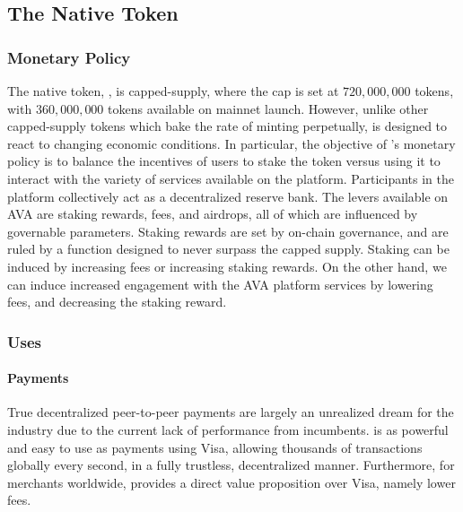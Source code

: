 \documentclass[runningheads]{llncs}
\begin{document}
\subsection{The \AVATokenName{} Native Token}

\subsubsection{Monetary Policy}
The native token, \AVATokenName{}, is capped-supply, where the cap is set at $720,000,000$ tokens, with $360,000,000$ tokens available on mainnet launch. However, unlike other capped-supply tokens which bake the rate of minting perpetually, \AVATokenName{} is designed to react to changing economic conditions. In particular, the objective of \AVATokenName{}'s monetary policy is to balance the incentives of users to stake the token versus using it to interact with the variety of services available on the platform. Participants in the platform collectively act as a decentralized reserve bank. The levers available on AVA are staking rewards, fees, and airdrops, all of which are influenced by governable parameters. Staking rewards are set by on-chain governance, and are ruled by a function designed to never surpass the capped supply. Staking can be induced by increasing fees or increasing staking rewards. On the other hand, we can induce increased engagement with the AVA platform services by lowering fees, and decreasing the staking reward. 

\subsubsection{Uses}
\paragraph{Payments}
True decentralized peer-to-peer payments are largely an unrealized dream for the industry due to the current lack of performance from incumbents. \AVATokenName{} is as powerful and easy to use as payments using Visa, allowing thousands of transactions globally every second, in a fully trustless, decentralized manner. Furthermore, for merchants worldwide, \AVATokenName{} provides a direct value proposition over Visa, namely lower fees.
\end{document}
